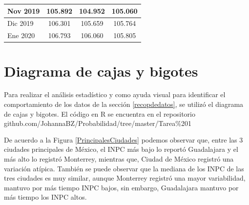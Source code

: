\documentclass[fontsize=12pt]{article}
\begin{document}
\begin{table}[htp]
\begin{tabular}{|l|c|c|c|}
Nov 2019                             & 105.892            & 104.952                                                                                  & 105.060              \\ \hline
Dic 2019                             & 106.301            & 105.659                                                                                  & 105.764              \\ \hline
Ene 2020                             & 106.793            & 106.060                                                                                  & 105.805              \\ \hline
\end{tabular}
\end{table}


\section{Diagrama de cajas y bigotes}
Para realizar el análisis estadístico y como ayuda visual para identificar el comportamiento de los datos de la sección \ref{recopdedatos}, se utilizó el diagrama de cajas y bigotes. El código en R se encuentra en el repositorio github.com/JohannaBZ/Probabilidad/tree/master/Tarea\%201

De acuerdo a la Figura \ref{PrincipalesCiudades} podemos observar que, entre las 3 ciudades principales de México, el INPC más bajo lo reportó Guadalajara y el más alto lo registró Monterrey, mientras que, Ciudad de México registró una variación atípica. También se puede observar que la mediana de los INPC de las tres ciudades es muy similar, aunque Monterrey registró una mayor variabilidad, mantuvo por más tiempo INPC bajos, sin embargo, Guadalajara mantuvo por más tiempo los INPC altos.
\end{document}
